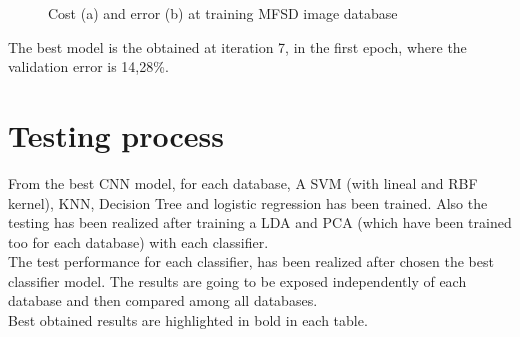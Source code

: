 \begin{figure}[htb]
\centering
\caption{Cost (a) and error (b) at training MFSD image database}
\label{fig:ejecucion2_mfsd_train}
\end{figure}

The best model is the obtained at iteration 7, in the first epoch, where the validation error is 14,28\%.\\

\section{Testing process}
From the best CNN model, for each database, A SVM (with lineal and RBF kernel), KNN, Decision Tree and logistic regression has been trained. Also the testing has been realized after training a LDA and PCA (which have been trained too for each database) with each classifier.\\

The test performance for each classifier, has been realized after chosen the best classifier model.  The results are going to be exposed independently of each database and then compared among all databases.\\

Best obtained results are highlighted in bold in each table.\\

